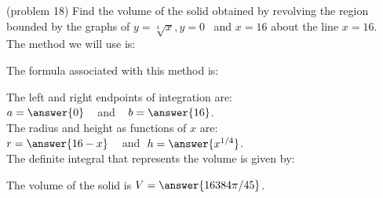 \documentclass{ximera}
\begin{document}
\begin{problem}(problem 18)
Find the volume of the solid obtained by revolving the region bounded by the graphs of $y = \sqrt[4] x, y = 0$ \, and $x = 16$ about the line $x = 16$.\\
The method we will use is:
\begin{multipleChoice}
\end{multipleChoice}

The formula associated with this method is:
\begin{multipleChoice}
\end{multipleChoice}

The left and right endpoints of integration are:\\
$a = \answer{0}\;\;\;$ and $\;\;\; b = \answer{16}$.\\
The radius and height as functions of $x$ are:\\
$r = \answer{16-x} \;\;\;$ and $\; h = \answer{x^{1/4} }$.\\

The definite integral that represents the volume is given by:\\
\begin{multipleChoice}
\end{multipleChoice}

The volume of the solid is $V = \answer{16384\pi/45}$.

\end{problem}



\end{document}
